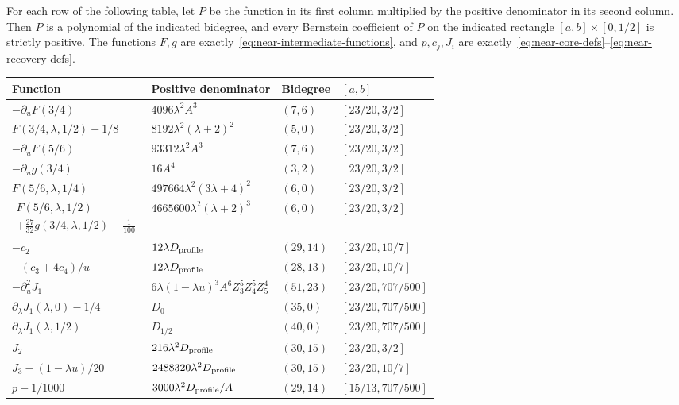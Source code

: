 \begin{lemma}\label{lem:near-finite-certificate}
For each row of the following table, let $P$ be the function in its first column multiplied by the positive denominator in its second column. Then $P$ is a polynomial of the indicated bidegree, and every Bernstein coefficient of $P$ on the indicated rectangle $[a,b]\times[0,1/2]$ is strictly positive. The functions $F,g$ are exactly~\eqref{eq:near-intermediate-functions}, and $p,c_j,J_i$ are exactly~\eqref{eq:near-core-defs}--\eqref{eq:near-recovery-defs}.
\begin{center}\small
\setlength{\tabcolsep}{3pt}
\begin{tabular}{@{}llll@{}}
Function & Positive denominator & Bidegree & $[a,b]$\\ \hline
$-\partial_uF(3/4)$ & $4096\lambda^2A^3$ & $(7,6)$ & $[23/20,3/2]$\\
$F(3/4,\lambda,1/2)-1/8$ & $8192\lambda^2(\lambda+2)^2$ & $(5,0)$ & $[23/20,3/2]$\\
$-\partial_uF(5/6)$ & $93312\lambda^2A^3$ & $(7,6)$ & $[23/20,3/2]$\\
$-\partial_ug(3/4)$ & $16A^4$ & $(3,2)$ & $[23/20,3/2]$\\
$F(5/6,\lambda,1/4)$ & $497664\lambda^2(3\lambda+4)^2$ & $(6,0)$ & $[23/20,3/2]$\\
$\begin{gathered}F(5/6,\lambda,1/2)\\+\frac{27}{32}g(3/4,\lambda,1/2)-\frac1{100}\end{gathered}$
 & $4665600\lambda^2(\lambda+2)^3$ & $(6,0)$ & $[23/20,3/2]$\\
$-c_2$ & $12\lambda D_{\rm profile}$ & $(29,14)$ & $[23/20,10/7]$\\
$-(c_3+4c_4)/u$ & $12\lambda D_{\rm profile}$ & $(28,13)$ & $[23/20,10/7]$\\
$-\partial_u^2J_1$ & $6\lambda(1-\lambda u)^3A^6Z_3^5Z_4^5Z_5^4$ & $(51,23)$ & $[23/20,707/500]$\\
$\partial_\lambda J_1(\lambda,0)-1/4$ & $D_0$ & $(35,0)$ & $[23/20,707/500]$\\
$\partial_\lambda J_1(\lambda,1/2)$ & $D_{1/2}$ & $(40,0)$ & $[23/20,707/500]$\\
$J_2$ & $216\lambda^2D_{\rm profile}$ & $(30,15)$ & $[23/20,3/2]$\\
$J_3-(1-\lambda u)/20$ & $2488320\lambda^2D_{\rm profile}$ & $(30,15)$ & $[23/20,10/7]$\\
$p-1/1000$ & $3000\lambda^2D_{\rm profile}/A$ & $(29,14)$ & $[15/13,707/500]$

\end{tabular}
\end{center}
\end{lemma}
